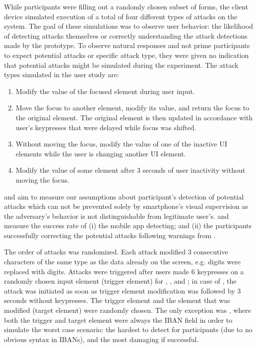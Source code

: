  \label{ssec:userStudyAttackEvaluation}
While participants were filling out a randomly chosen subset of forms, the client device simulated execution of a total of four different types of attacks on the \sysname system.
The goal of these simulations was to observe user behavior: the likelihood of detecting attacks themselves or correctly understanding the attack detections made by the \sysname prototype.
To observe natural responses and not prime participants to expect potential attacks or specific attack type, they were given no indication that potential attacks might be simulated during the experiment.
The attack types simulated in the user study are:
\begin{enumerate}%
	\item[\atk{1}] Modify the value of the focused element during user input.
	\item[\atk{2}] Move the focus to another element, modify its value, and return the focus to the original element.
	The original element is then updated in accordance with user's keypresses that were delayed while focus was shifted.
	\item[\atk{3}] Without moving the focus, modify the value of one of the inactive UI elements while the user is changing another UI element.
	\item[\atk{4}] Modify the value of some element after 3 seconds of user inactivity without moving the focus.
\end{enumerate}
 and  aim to measure our assumptions about participant's detection of potential attacks which can not be prevented solely by smartphone's visual supervision as the adversary's behavior is not distinguishable from legitimate user's.
 and  measure the success rate of (i) the mobile app detecting; and (ii) the participants successfully correcting the potential attacks following warnings from \name.

The order of attacks was randomized.
Each attack modified 3 consecutive characters of the same type as the data already on the screen, e.g. digits were replaced with digits.
Attacks were triggered after users made 6 keypresses on a randomly chosen input element (trigger element) for , , and ; in case of , the attack was initiated as soon as trigger element modification was followed by 3 seconds without keypresses.
The trigger element and the element that was modified (target element) were randomly chosen.
The only exception was , where both the trigger and target element were always the IBAN field in order to simulate the worst case scenario: the hardest to detect for participants (due to no obvious syntax in IBANs), and the most damaging if successful.

